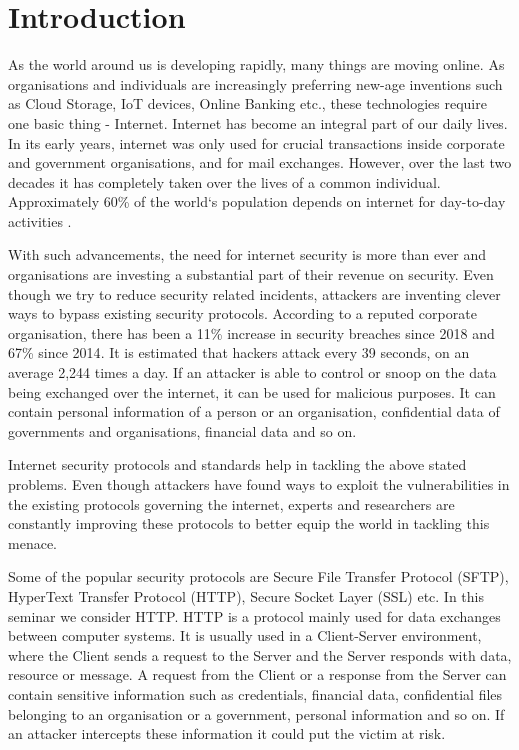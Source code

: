 \chapter{Introduction}

As the world around us is developing rapidly, many things are moving online. As organisations and individuals are increasingly preferring new-age inventions such as Cloud Storage, IoT devices, Online Banking etc., these technologies require one basic thing - Internet. Internet has become an integral part of our daily lives. In its early years, internet was only used for crucial transactions inside corporate and government organisations, and for mail exchanges. However, over the last two decades it has completely taken over the lives of a common individual. Approximately 60\% of the world`s population depends on internet for day-to-day activities \cite{b16}. 

With such advancements, the need for internet security is more than ever and organisations are investing a substantial part of their revenue on security\cite{b2}. Even though we try to reduce security related incidents, attackers are inventing clever ways to bypass existing security protocols. According to a reputed corporate organisation, there has been a 11\% increase in security breaches since 2018 and 67\% since 2014\cite{b3}. It is estimated that hackers attack every 39 seconds, on an average 2,244 times a day\cite{b4}. If an attacker is able to control or snoop on the data being exchanged over the internet, it can be used for malicious purposes. It can contain personal information of a person or an organisation, confidential data of governments and organisations, financial data and so on.

Internet security protocols and standards help in tackling the above stated problems. Even though attackers have found ways to exploit the vulnerabilities in the existing protocols governing the internet, experts and researchers are constantly improving these protocols to better equip the world in tackling this menace.  

Some of the popular security protocols are Secure File Transfer Protocol (SFTP), HyperText Transfer Protocol (HTTP), Secure Socket Layer (SSL) etc. In this seminar we consider HTTP. HTTP is a protocol mainly used for data exchanges between computer systems. It is usually used in a Client-Server environment, where the Client sends a request to the Server and the Server responds with data, resource or message. A request from the Client or a response from the Server can contain sensitive information such as credentials, financial data, confidential files belonging to an organisation or a government, personal information and so on. If an attacker intercepts these information it could put the victim at risk.  

